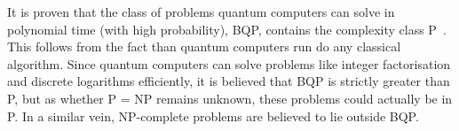 It is proven that the class of problems quantum computers can solve in polynomial time (with high probability), BQP, contains the complexity class P~\autocite{nielsen2012}.
This follows from the fact than quantum computers run do any classical algorithm.
Since quantum computers can solve problems like integer factorisation and discrete logarithms efficiently, it is believed that BQP is strictly greater than P, but as whether P = NP remains unknown, these problems could actually be in P.
In a similar vein, NP-complete problems are believed to lie outside BQP.